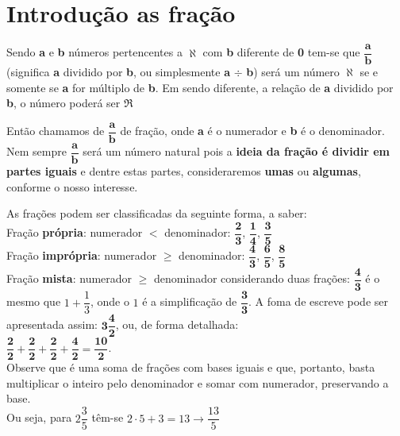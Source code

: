 	
 \section{Introdução as fração}
 	Sendo \textbf{a} e \textbf{b} números pertencentes a \textbf{$\aleph$} com \textbf{b} diferente de \textbf{0} tem-se que $\dfrac{\textbf{a}}{\textbf{b}}$  (significa \textbf{a} dividido por \textbf{b}, ou simplesmente \textbf{a} $\div$ \textbf{b}) será um número \textbf{$\aleph$} se e somente se \textbf{a} for múltiplo de \textbf{b}. Em sendo diferente, a relação de \textbf{a} dividido por \textbf{b}, o número poderá ser \textbf{$\Re$}
 	
 	Então chamamos de $\dfrac{\textbf{a}}{\textbf{b}}$ de fração, onde \textbf{a} é o numerador e \textbf{b} é o denominador. Nem sempre $\dfrac{\textbf{a}}{\textbf{b}}$ será um número natural pois a \textbf{ideia da fração é dividir em partes iguais} e dentre estas partes, consideraremos \textbf{umas} ou \textbf{algumas}, conforme o nosso interesse.
 	
 	As frações podem ser classificadas da seguinte forma, a saber:\\
 	
 	\indent \indent Fração \textbf{própria}: numerador $<$ denominador: $\dfrac{\textbf{2}}{\textbf{3}}$, $\dfrac{\textbf{1}}{\textbf{4}}$, $\dfrac{\textbf{3}}{\textbf{5}}$ \\
 	
 	\indent \indent Fração \textbf{imprópria}: numerador $\ge$ denominador: $\dfrac{\textbf{4}}{\textbf{3}}$, $\dfrac{\textbf{6}}{\textbf{5}}$, $\dfrac{\textbf{8}}{\textbf{5}}$ \\
 	
 	\indent \indent Fração \textbf{mista}: numerador $\geq$ denominador considerando duas frações: $\dfrac{\textbf{4}}{\textbf{3}}$ é o mesmo que $ 1 + \dfrac{1}{3} $, onde o $ 1 $ é a simplificação de $\dfrac{\textbf{3}}{\textbf{3}}$. A foma de escreve pode ser apresentada assim: $\textbf{3}\dfrac{\textbf{4}}{\textbf{2}}$, ou, de forma detalhada:\\
 	
 	$\dfrac{\textbf{2}}{\textbf{2}} + \dfrac{\textbf{2}}{\textbf{2}} + \dfrac{\textbf{2}}{\textbf{2}} + \dfrac{\textbf{4}}{\textbf{2}} = \dfrac{\textbf{10}}{\textbf{2}}$. \\
 	
 	Observe que é uma soma de frações com bases iguais e que, portanto, basta multiplicar o inteiro pelo denominador e somar com numerador, preservando a base. \\
 	Ou seja, para $ 2\dfrac{3}{5} $ têm-se $ 2 \cdot 5 + 3 = 13 \longrightarrow \dfrac{13}{5} $ \\
 	
